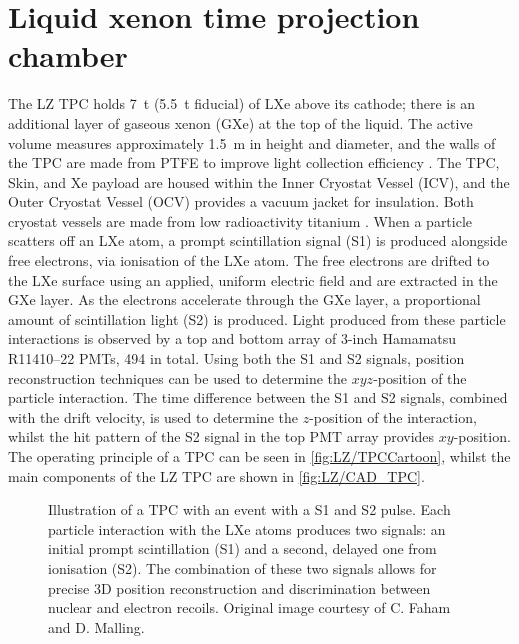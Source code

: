 \section{Liquid xenon time projection chamber}\label{sec:LZ/LXeTPC}
The LZ TPC holds 7~t (5.5~t fiducial) of LXe above its cathode; there is an additional layer of gaseous xenon (GXe) at the top of the liquid. The active volume measures approximately 1.5~m in height and diameter, and the walls of the TPC are made from PTFE to improve light collection efficiency \cite{LZNIMA}. The TPC, Skin, and Xe payload are housed within the Inner Cryostat Vessel (ICV), and the Outer Cryostat Vessel (OCV) provides a vacuum jacket for insulation. Both cryostat vessels are made from low radioactivity titanium \cite{LZ:2017iwn}. When a particle scatters off an LXe atom, a prompt scintillation signal (S1) is produced alongside free electrons, via ionisation of the LXe atom. The free electrons are drifted to the LXe surface using an applied, uniform electric field and are extracted in the GXe layer. As the electrons accelerate through the GXe layer, a proportional amount of scintillation light (S2) is produced. Light produced from these particle interactions is observed by a top and bottom array of 3-inch Hamamatsu R11410–22 PMTs, 494 in total. Using both the S1 and S2 signals, position reconstruction techniques can be used to determine the $xyz$-position of the particle interaction. The time difference between the S1 and S2 signals, combined with the drift velocity, is used to determine the $z$-position of the interaction, whilst the hit pattern of the S2 signal in the top PMT array provides $xy$-position. The operating principle of a TPC can be seen in \autoref{fig:LZ/TPCCartoon}, whilst the main components of the LZ TPC are shown in \autoref{fig:LZ/CAD_TPC}.
\begin{figure}[!ht]
    \centering
    
    \caption[Illustration of a TPC with an event with a S1 and S2 pulse.]{Illustration of a TPC with an event with a S1 and S2 pulse. Each particle interaction with the LXe atoms produces two signals: an initial prompt scintillation (S1) and a second, delayed one from ionisation (S2). The combination of these two signals allows for precise 3D position reconstruction and discrimination between nuclear and electron recoils. Original image courtesy of C. Faham and D. Malling.}
    \label{fig:LZ/TPCCartoon}
\end{figure}

